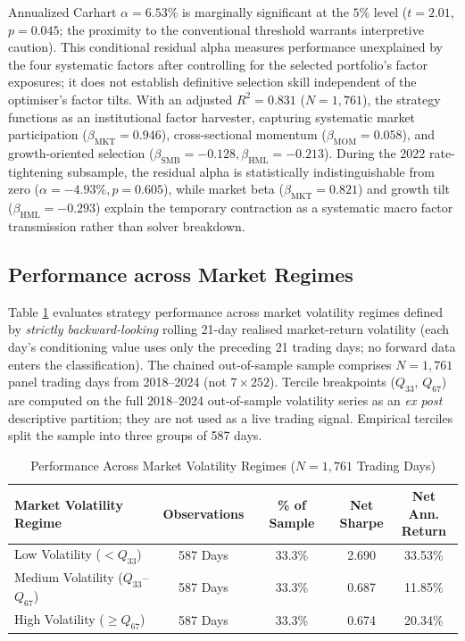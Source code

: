 \documentclass[11pt,a4paper]{article}
\begin{document}
Annualized Carhart $\alpha = 6.53\%$ is marginally significant at the $5\%$ level ($t=2.01$, $p=0.045$; the proximity to the conventional threshold warrants interpretive caution). This conditional residual alpha measures performance unexplained by the four systematic factors after controlling for the selected portfolio's factor exposures; it does not establish definitive selection skill independent of the optimiser's factor tilts. With an adjusted $R^2 = 0.831$ ($N=1{,}761$), the strategy functions as an institutional factor harvester, capturing systematic market participation ($\beta_{\text{MKT}}=0.946$), cross-sectional momentum ($\beta_{\text{MOM}}=0.058$), and growth-oriented selection ($\beta_{\text{SMB}}=-0.128, \beta_{\text{HML}}=-0.213$). During the 2022 rate-tightening subsample, the residual alpha is statistically indistinguishable from zero ($\alpha = -4.93\%, p=0.605$), while market beta ($\beta_{\mathrm{MKT}}=0.821$) and growth tilt ($\beta_{\mathrm{HML}}=-0.293$) explain the temporary contraction as a systematic macro factor transmission rather than solver breakdown.

\subsection{Performance across Market Regimes}
\label{sec:regimes}
Table \ref{tab:vix_regime} evaluates strategy performance across market volatility regimes defined by \emph{strictly backward-looking} rolling 21-day realised market-return volatility (each day's conditioning value uses only the preceding 21 trading days; no forward data enters the classification). The chained out-of-sample sample comprises $N=1{,}761$ panel trading days from 2018--2024 (not $7\times 252$). Tercile breakpoints ($Q_{33}$, $Q_{67}$) are computed on the full 2018--2024 out-of-sample volatility series as an \emph{ex post} descriptive partition; they are not used as a live trading signal. Empirical terciles split the sample into three groups of 587 days.

\begin{table}[htbp]
\centering
\caption{Performance Across Market Volatility Regimes ($N=1{,}761$ Trading Days)}
\label{tab:vix_regime}
\begin{tabular}{lcccc}
\toprule
\textbf{Market Volatility Regime} &
\textbf{Observations} &
\textbf{\% of Sample} &
\makecell{\textbf{Net}\\\textbf{Sharpe}} &
\makecell{\textbf{Net Ann.}\\\textbf{Return}} \\
\midrule
Low Volatility ($< Q_{33}$) & 587 Days & 33.3\% & 2.690 & 33.53\% \\
Medium Volatility ($Q_{33}$--$Q_{67}$) & 587 Days & 33.3\% & 0.687 & 11.85\% \\
High Volatility ($\ge Q_{67}$) & 587 Days & 33.3\% & 0.674 & 20.34\% \\
\bottomrule
\end{tabular}
\end{table}
\end{document}
